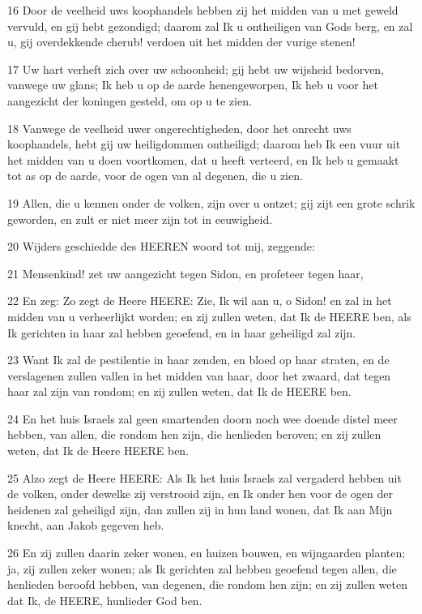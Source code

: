 \par 16 Door de veelheid uws koophandels hebben zij het midden van u met geweld vervuld, en gij hebt gezondigd; daarom zal Ik u ontheiligen van Gods berg, en zal u, gij overdekkende cherub! verdoen uit het midden der vurige stenen!
\par 17 Uw hart verheft zich over uw schoonheid; gij hebt uw wijsheid bedorven, vanwege uw glans; Ik heb u op de aarde henengeworpen, Ik heb u voor het aangezicht der koningen gesteld, om op u te zien.
\par 18 Vanwege de veelheid uwer ongerechtigheden, door het onrecht uws koophandels, hebt gij uw heiligdommen ontheiligd; daarom heb Ik een vuur uit het midden van u doen voortkomen, dat u heeft verteerd, en Ik heb u gemaakt tot as op de aarde, voor de ogen van al degenen, die u zien.
\par 19 Allen, die u kennen onder de volken, zijn over u ontzet; gij zijt een grote schrik geworden, en zult er niet meer zijn tot in eeuwigheid.
\par 20 Wijders geschiedde des HEEREN woord tot mij, zeggende:
\par 21 Mensenkind! zet uw aangezicht tegen Sidon, en profeteer tegen haar,
\par 22 En zeg: Zo zegt de Heere HEERE: Zie, Ik wil aan u, o Sidon! en zal in het midden van u verheerlijkt worden; en zij zullen weten, dat Ik de HEERE ben, als Ik gerichten in haar zal hebben geoefend, en in haar geheiligd zal zijn.
\par 23 Want Ik zal de pestilentie in haar zenden, en bloed op haar straten, en de verslagenen zullen vallen in het midden van haar, door het zwaard, dat tegen haar zal zijn van rondom; en zij zullen weten, dat Ik de HEERE ben.
\par 24 En het huis Israels zal geen smartenden doorn noch wee doende distel meer hebben, van allen, die rondom hen zijn, die henlieden beroven; en zij zullen weten, dat Ik de Heere HEERE ben.
\par 25 Alzo zegt de Heere HEERE: Als Ik het huis Israels zal vergaderd hebben uit de volken, onder dewelke zij verstrooid zijn, en Ik onder hen voor de ogen der heidenen zal geheiligd zijn, dan zullen zij in hun land wonen, dat Ik aan Mijn knecht, aan Jakob gegeven heb.
\par 26 En zij zullen daarin zeker wonen, en huizen bouwen, en wijngaarden planten; ja, zij zullen zeker wonen; als Ik gerichten zal hebben geoefend tegen allen, die henlieden beroofd hebben, van degenen, die rondom hen zijn; en zij zullen weten dat Ik, de HEERE, hunlieder God ben.

